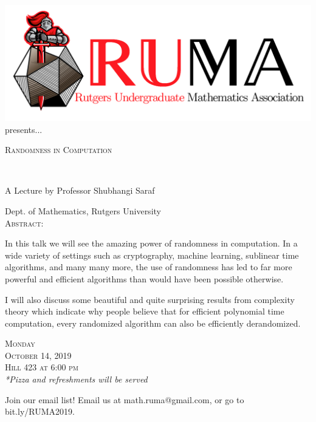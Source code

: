 \documentclass[12pt]{article}
\begin{document}

\begin{center}\includegraphics[scale=.35]{RUMAlogo.png}\\
presents... \\
\begin{spacing}{1}
{\fontsize{40}{44}\selectfont  \textsc{
Randomness in Computation}} \end{spacing}
 

~~\\
\begin{spacing}{1.5}
{\fontsize{24}{24} \selectfont A Lecture by Professor Shubhangi
  Saraf}  \end{spacing} 
\large Dept. of Mathematics, Rutgers University \\

\vspace{5mm}
\normalsize
\textsc{Abstract:}

\Large 
In this talk we will see the amazing power of randomness 
in computation. In a wide variety of settings such as cryptography, 
machine learning, sublinear time algorithms, and many many more,
the use of randomness has led to far more powerful and efficient algorithms 
than would have been possible otherwise.

\vspace{2mm}
I will also discuss some beautiful and quite surprising results
from complexity theory which indicate why people believe that for
efficient polynomial time computation, every randomized algorithm
can also be efficiently derandomized.

\vspace{5mm} 
\huge   \textsc{Monday\\October 14, 2019 \\Hill 423 at 6:00 pm}
\\

\vspace{5mm}
\large
\emph{*Pizza and refreshments will be served}
\end{center}
\begin{center}
  \large  Join our email list! Email us at math.ruma@gmail.com, or
go to bit.ly/RUMA2019.\\
\end{center}
\end{document}
